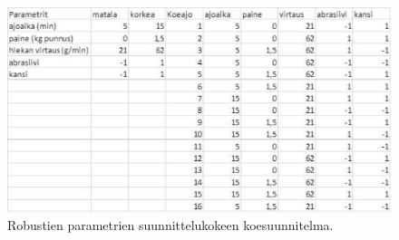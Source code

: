 \documentclass[12pt,a4paper,finnish]{tutthesis}
\begin{document}
\begin{figure}
  \begin{center}
    \includegraphics[width=1.0\textwidth]{tarray}
  \end{center}
  \caption[Robustien parametrien koesuunnitelma]{Robustien parametrien suunnittelukokeen koesuunnitelma.}
  \label{fig:tarray}
\end{figure}
\end{document}
